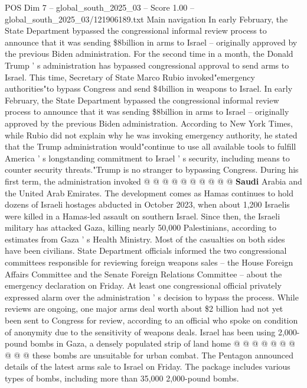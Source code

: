 \begin{textsample}{POS Dim 7 – global\_south\_2025\_03 – Score 1.00 – global\_south\_2025\_03/121906189.txt}  \label{ex:f7_pos_096}
Main navigation In early February, the State Department bypassed the congressional informal review process to announce that it was sending \$8billion in arms to Israel -- originally approved by the previous Biden administration.
For the second time in a month, the Donald Trump ' s administration has bypassed congressional approval to send arms to Israel.
This time, Secretary of State Marco Rubio invoked"emergency authorities"to bypass Congress and send \$4billion in weapons to Israel.
In early February, the State Department bypassed the congressional informal review process to announce that it was sending \$8billion in arms to Israel -- originally approved by the previous Biden administration.
According to New York Times, while Rubio did not explain why he was invoking emergency authority, he stated that the Trump administration would"continue to use all available tools to fulfill America ' s longstanding commitment to Israel ' s security, including means to counter security threats."Trump is no stranger to bypassing Congress.
During his first term, the administration invoked @ @ @ @ @ @ @ @ @ @ \textbf{Saudi} Arabia and the United Arab Emirates.
The development comes as Hamas continues to hold dozens of Israeli hostages abducted in October 2023, when about 1,200 Israelis were killed in a Hamas-led assault on southern Israel.
Since then, the Israeli military has attacked Gaza, killing nearly 50,000 Palestinians, according to estimates from Gaza ' s Health Ministry.
Most of the casualties on both sides have been civilians.
State Department officials informed the two congressional committees responsible for reviewing foreign weapons sales -- the House Foreign Affairs Committee and the Senate Foreign Relations Committee -- about the emergency declaration on Friday.
At least one congressional official privately expressed alarm over the administration ' s decision to bypass the process.
While reviews are ongoing, one major arms deal worth about \$2 billion had not yet been sent to Congress for review, according to an official who spoke on condition of anonymity due to the sensitivity of weapons deals.
Israel has been using 2,000-pound bombs in Gaza, a densely populated strip of land home @ @ @ @ @ @ @ @ @ @ these bombs are unsuitable for urban combat.
The Pentagon announced details of the latest arms sale to Israel on Friday.
The package includes various types of bombs, including more than 35,000 2,000-pound bombs.

\end{textsample}
